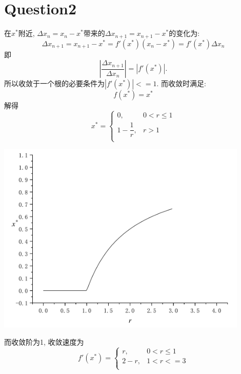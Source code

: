\documentclass[UTF8]{ctexart}
\begin{document}
    \section{Question2}
        \indent 在$x^*$附近, $\Delta x_n=x_n-x^*$带来的$\Delta x_{n+1}=x_{n+1}-x^*$的变化为:
        \begin{equation}
            \Delta x_{n+1}=x_{n+1}-x^*=f'(x^*)\left(x_n-x^*\right)=f'(x^*)\Delta x_n
        \end{equation}
        即
        \begin{equation}
            \left|\dfrac{\Delta x_{n+1}}{\Delta x_n}\right|=\left|f'(x^*)\right|.
        \end{equation}
        所以收敛于一个根的必要条件为$\left|f'(x^*)\right|<=1$. 而收敛时满足:
        \begin{equation}
            f(x^*)=x^*
        \end{equation}
        解得
        \begin{equation}
            x^*=\left\{
            \begin{array}{cc}
                0,&0<r\leqslant1\\
                1-\dfrac{1}{r},&r>1\\
            \end{array}
            \right.
        \end{equation}
        \begin{center}
            \includegraphics[width=12cm]{t1-1.pdf}
        \end{center}
        而收敛阶为1, 收敛速度为
        \begin{equation}
            f'(x^*)=\left\{
            \begin{array}{cc}
                r,&0<r\leqslant1\\
                2-r,&1<r<=3\\
            \end{array}
            \right.
        \end{equation}
\end{document}
